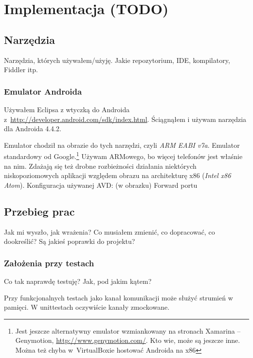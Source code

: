 \chapter{Implementacja (TODO)}

\section{Narzędzia}
Narzędzia, których używałem/użyję. Jakie repozytorium, IDE, kompilatory, Fiddler itp.

\subsection{Emulator Androida}
\label{android-emulator}
Używałem Eclipsa z wtyczką do Androida z~\url{http://developer.android.com/sdk/index.html}.
Ściągnąłem i używam narzędzia dla Androida 4.4.2.

Emulator chodził na obrazie do tych narzędzi, czyli \emph{ARM EABI v7a}. Emulator standardowy od Google.\footnote{Jest jeszcze alternatywny emulator wzmiankowany na stronach Xamarina -- Genymotion, \url{http://www.genymotion.com/}. Kto wie, może są jeszcze inne. Można też chyba w~VirtualBoxie hostować Androida na x86}
Używam ARMowego, bo więcej telefonów jest właśnie na nim. Zdażają się też drobne rozbieżności działania niektórych niskopoziomowych aplikacji względem obrazu na architekturę x86 (\emph{Intel x86 Atom}).
Konfiguracja używanej AVD: (w obrazku)
Forward portu

\section{Przebieg prac}
Jak mi wyszło, jak wrażenia? Co musiałem zmienić, co dopracować, co dookreślić? Są jakieś poprawki do projektu?

\subsection{Założenia przy testach}
Co tak naprawdę testuję? Jak, pod jakim kątem?

Przy funkcjonalnych testach jako kanał komunikacji może służyć strumień w pamięci. W unittestach oczywiście kanały zmockowane.